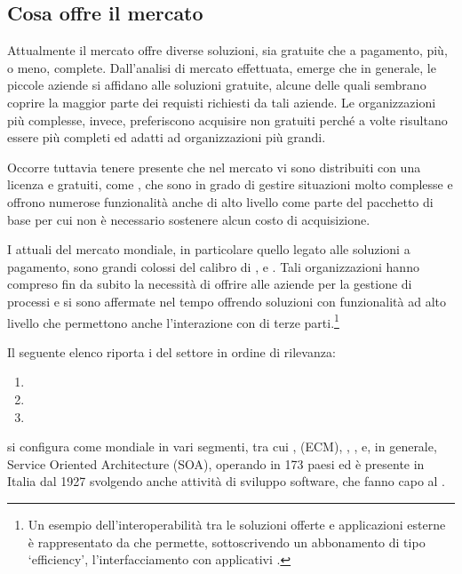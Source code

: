 \subsection{Cosa offre il mercato}\label{sec:currentmarket}
Attualmente il mercato offre diverse soluzioni, sia gratuite che a pagamento, più, o meno, complete.	
Dall'analisi di mercato effettuata, emerge che in generale, le piccole aziende si affidano alle soluzioni gratuite, alcune delle quali sembrano coprire la maggior parte dei requisti richiesti da tali aziende. Le organizzazioni più complesse, invece, preferiscono acquisire \sw non gratuiti perché a volte risultano essere più completi ed adatti ad organizzazioni più grandi.

Occorre tuttavia tenere presente che nel mercato vi sono \sw distribuiti con una licenza  e gratuiti, come , che sono in grado di gestire situazioni molto complesse e offrono numerose funzionalità anche di alto livello come parte del pacchetto di base per cui non è necessario sostenere alcun costo di acquisizione.
 
I  attuali del mercato mondiale, in particolare quello legato alle soluzioni \sw a pagamento, sono grandi colossi del calibro di ,  e . Tali organizzazioni hanno compreso fin da subito la necessità di offrire alle aziende \sw per la gestione di processi e si sono affermate nel tempo offrendo soluzioni con funzionalità ad alto livello che permettono anche l'interazione con \sw di terze parti.\footnote{%
Un esempio dell'interoperabilità tra le soluzioni offerte e applicazioni esterne è rappresentato da  che permette, sottoscrivendo un abbonamento di tipo `\textsf{efficiency}', l'interfacciamento con applicativi .
}

Il seguente elenco riporta i  del settore in ordine di rilevanza:
\begin{enumerate}
  \item {}
  \item {}
  \item {}
\end{enumerate}

 si configura come  mondiale in vari segmenti, tra cui ,  (ECM), , ,  e, in generale, Service Oriented Architecture (SOA), operando in 173 paesi ed è presente in Italia dal 1927 svolgendo anche attività di sviluppo software, che fanno capo al .

